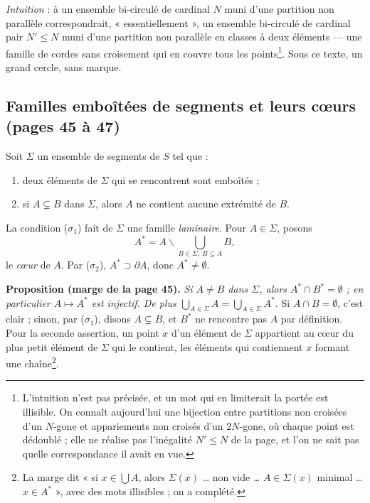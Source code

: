 \documentclass[11pt,a4paper]{article}
\begin{document}
\emph{Intuition} : à un ensemble bi-circulé de cardinal $N$ muni d'une
partition non parallèle correspondrait, « essentiellement », un ensemble
bi-circulé de cardinal pair $N' \leqslant N$ muni d'une partition non
parallèle en classes à deux éléments --- une famille de cordes sans
croisement qui en couvre tous les points\footnote{L'intuition n'est pas
précisée, et un mot qui en limiterait la portée est illisible. On connaît
aujourd'hui une bijection entre partitions non croisées d'un $N$-gone et
appariements non croisés d'un $2N$-gone, où chaque point est dédoublé ; elle
ne réalise pas l'inégalité $N' \leqslant N$ de la page, et l'on ne sait pas
quelle correspondance il avait en vue.}. Sous ce texte, un grand cercle, sans
marque.

\subsection*{Familles emboîtées de segments et leurs cœurs (pages 45 à 47)}

Soit $\Sigma$ un ensemble de segments de $S$ tel que :
\begin{enumerate}
  \item[($\sigma_1$)] deux éléments de $\Sigma$ qui se rencontrent sont
  emboîtés ;
  \item[($\sigma_2$)] si $A \subsetneq B$ dans $\Sigma$, alors $A$ ne contient
  aucune extrémité de $B$.
\end{enumerate}
La condition ($\sigma_1$) fait de $\Sigma$ une famille \emph{laminaire}. Pour
$A \in \Sigma$, posons
\[
A^{*} = A \smallsetminus \bigcup_{B \in \Sigma,\ B \subsetneq A} B,
\]
le \emph{cœur} de $A$. Par ($\sigma_2$), $A^{*} \supset \partial A$, donc
$A^{*} \neq \emptyset$.

\textbf{Proposition (marge de la page 45).} \emph{Si $A \neq B$ dans
$\Sigma$, alors $A^{*} \cap B^{*} = \emptyset$ ; en particulier $A \mapsto
A^{*}$ est injectif. De plus $\bigcup_{A \in \Sigma} A = \bigcup_{A \in
\Sigma} A^{*}$.} Si $A \cap B = \emptyset$, c'est clair ; sinon, par
($\sigma_1$), disons $A \subsetneq B$, et $B^{*}$ ne rencontre pas $A$ par
définition. Pour la seconde assertion, un point $x$ d'un élément de $\Sigma$
appartient au cœur du plus petit élément de $\Sigma$ qui le contient, les
éléments qui contiennent $x$ formant une chaîne\footnote{La marge dit « si
$x \in \bigcup A$, alors $\Sigma(x)$ … non vide … $A \in \Sigma(x)$ minimal
… $x \in A^{*}$ », avec des mots illisibles ; on a complété.}.
\end{document}
